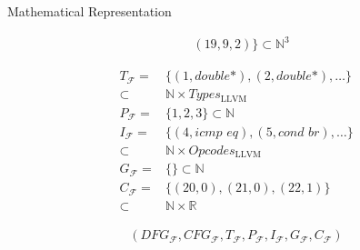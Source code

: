\begin{blackbox}{Mathematical Representation}
\begin{minipage}{0.329\textwidth}
\begin{graybox}
\begin{align*}
                  &(19,9,2)\}\subset\mathbb N^3
            \end{align*}
        \end{graybox}
    \end{minipage}
    \begin{minipage}{0.329\textwidth}
        \centering
        \begin{graybox}
            \scriptsize
            \setlength{\abovedisplayskip}{0pt}
            \setlength{\belowdisplayskip}{0pt}
            \vspace{-0.5em}
            \begin{align*}
                T_\mathcal F={}&\{(1,\textit{double*}),(2,\textit{double*}),\dots\}\\[-0.5em]
                      \subset{}&\mathbb N\times Types_\text{LLVM}\\[-0.25em]
                P_\mathcal F={}&\{1,2,3\}\subset\mathbb N\\[-0.25em]
                I_\mathcal F={}&\{(4,\textit{icmp eq}),(5,\textit{cond br}),\dots\}\\[-0.5em]
                      \subset{}&\mathbb N\times Opcodes_\text{LLVM}\\[-0.25em]
                G_\mathcal F={}&\{\}\subset\mathbb N\\[-0.25em]
                C_\mathcal F={}&\{(20,0),(21,0),(22,1)\}\\[-0.5em]
                      \subset{}&\mathbb N\times\mathbb R
            \end{align*}

            \vspace{0.45em}
        \end{graybox}
    \end{minipage}

    \begin{minipage}{0.5\textwidth}
        \begin{graybox}
            \setlength{\abovedisplayskip}{0pt}
            \setlength{\belowdisplayskip}{0pt}
            \vspace{-0.5em}
            \begin{align*}
                (DFG_\mathcal{F},
                 CFG_\mathcal{F},
                 T_\mathcal{F},
                 P_\mathcal{F},
                 I_\mathcal{F},
                 G_\mathcal{F},
                 C_\mathcal{F})
            \end{align*}
        \end{graybox}
    \end{minipage}
\end{blackbox}